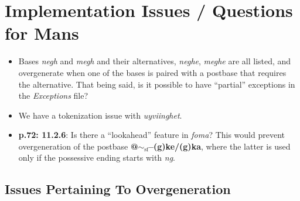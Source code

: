 \documentclass{article}
\begin{document}

\section{Implementation Issues / Questions for Mans}

\begin{itemize}
\renewcommand\labelitemi{$\cdot$}

\item Bases \textit{negh} and \textit{megh} and their alternatives, \textit{neghe}, \textit{meghe} are all listed, and overgenerate when one of the bases is paired with a postbase that requires the alternative.
%
That being said, is it possible to have ``partial'' exceptions in the \textit{Exceptions} file?

\item We have a tokenization issue with \textit{uyviinghet}.

\item \textbf{p.72: 11.2.6}: Is there a ``lookahead'' feature in \textit{foma}?
%
This would prevent overgeneration of the postbase \textbf{@$\sim_\text{sf}$--(g)ke/(g)ka}, where the latter is used only if the possessive ending starts with \textit{ng}.

\end{itemize}

\subsection{Issues Pertaining To Overgeneration}
\end{document}
